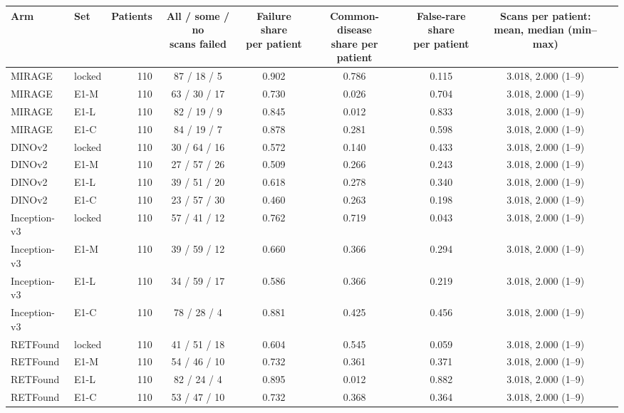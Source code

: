 \begin{tabular}{@{}llrcccccc@{}}
\toprule
Arm & Set & Patients & \makecell{All / some / no\\scans failed} & \makecell{Failure share\\per patient} & \makecell{Common-disease\\share per patient} & \makecell{False-rare share\\per patient} & \makecell{Scans per patient:\\mean, median (min--max)} \\
\midrule
MIRAGE & locked & 110 & 87 / 18 / 5 & 0.902 & 0.786 & 0.115 & 3.018, 2.000 (1--9) \\
MIRAGE & E1-M & 110 & 63 / 30 / 17 & 0.730 & 0.026 & 0.704 & 3.018, 2.000 (1--9) \\
MIRAGE & E1-L & 110 & 82 / 19 / 9 & 0.845 & 0.012 & 0.833 & 3.018, 2.000 (1--9) \\
MIRAGE & E1-C & 110 & 84 / 19 / 7 & 0.878 & 0.281 & 0.598 & 3.018, 2.000 (1--9) \\
DINOv2 & locked & 110 & 30 / 64 / 16 & 0.572 & 0.140 & 0.433 & 3.018, 2.000 (1--9) \\
DINOv2 & E1-M & 110 & 27 / 57 / 26 & 0.509 & 0.266 & 0.243 & 3.018, 2.000 (1--9) \\
DINOv2 & E1-L & 110 & 39 / 51 / 20 & 0.618 & 0.278 & 0.340 & 3.018, 2.000 (1--9) \\
DINOv2 & E1-C & 110 & 23 / 57 / 30 & 0.460 & 0.263 & 0.198 & 3.018, 2.000 (1--9) \\
Inception-v3 & locked & 110 & 57 / 41 / 12 & 0.762 & 0.719 & 0.043 & 3.018, 2.000 (1--9) \\
Inception-v3 & E1-M & 110 & 39 / 59 / 12 & 0.660 & 0.366 & 0.294 & 3.018, 2.000 (1--9) \\
Inception-v3 & E1-L & 110 & 34 / 59 / 17 & 0.586 & 0.366 & 0.219 & 3.018, 2.000 (1--9) \\
Inception-v3 & E1-C & 110 & 78 / 28 / 4 & 0.881 & 0.425 & 0.456 & 3.018, 2.000 (1--9) \\
RETFound & locked & 110 & 41 / 51 / 18 & 0.604 & 0.545 & 0.059 & 3.018, 2.000 (1--9) \\
RETFound & E1-M & 110 & 54 / 46 / 10 & 0.732 & 0.361 & 0.371 & 3.018, 2.000 (1--9) \\
RETFound & E1-L & 110 & 82 / 24 / 4 & 0.895 & 0.012 & 0.882 & 3.018, 2.000 (1--9) \\
RETFound & E1-C & 110 & 53 / 47 / 10 & 0.732 & 0.368 & 0.364 & 3.018, 2.000 (1--9) \\
\bottomrule
\end{tabular}
